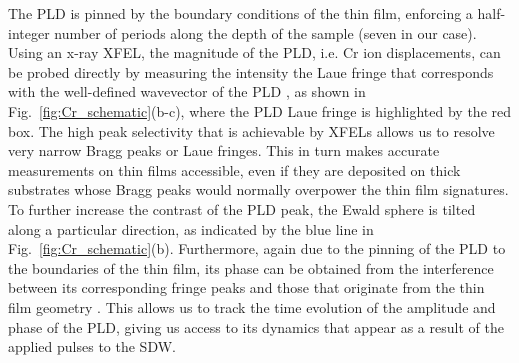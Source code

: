 The \gls{PLD} is pinned by the boundary conditions of the thin film, enforcing a half-integer number of periods along the depth of the sample (seven in our case)\cite{Soh2011,Singer2016,Singer2015prb}.
Using an x-ray \gls{XFEL}, the magnitude of the \gls{PLD}, i.e. Cr ion displacements, can be probed directly by measuring the intensity the Laue fringe that corresponds with the well-defined wavevector of the \gls{PLD} \cite{Singer2015prb, Singer2015prl}, as shown in Fig.~\ref{fig:Cr_schematic}(b-c), where the \gls{PLD} Laue fringe is highlighted by the red box. 
The high peak selectivity that is achievable by \glspl{XFEL} allows us to resolve very narrow Bragg peaks or Laue fringes. 
This in turn makes accurate measurements on thin films accessible, even if they are deposited on thick substrates whose Bragg peaks would normally overpower the thin film signatures.
To further increase the contrast of the \gls{PLD} peak, the Ewald sphere is tilted along a particular direction, as indicated by the blue line in Fig.~\ref{fig:Cr_schematic}(b).
Furthermore, again due to the pinning of the \gls{PLD} to the boundaries of the thin film, its phase can be obtained from the interference between its corresponding fringe peaks and those that originate from the thin film geometry \cite{Singer2015prb}.
This allows us to track the time evolution of the amplitude and phase of the \gls{PLD}, giving us access to its dynamics that appear as a result of the applied pulses to the \gls{SDW}.

